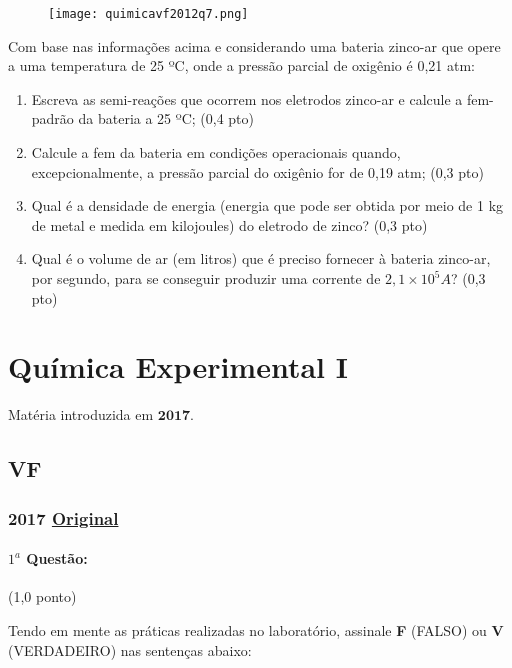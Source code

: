 \documentclass[12pt,a4paper]{article}
\newcommand{\original}[1]{\tiny \href{#1}{Original} \normalsize}
\begin{document}
\begin{figure}[h]
\centering
\texttt{[image: quimicavf2012q7.png]}
\end{figure}

Com base nas informações acima e considerando uma bateria zinco-ar que opere a uma temperatura de 25 ºC, onde a pressão parcial de oxigênio é 0,21 atm:

\begin{enumerate}[label=\alph*.]
\item Escreva as semi-reações que ocorrem nos eletrodos zinco-ar e calcule a fem-padrão da bateria a 25 ºC; \hfill (0,4 pto)
\item Calcule a fem da bateria em condições operacionais quando, excepcionalmente, a pressão parcial do oxigênio for de 0,19 atm; \hfill (0,3 pto)
\item Qual é a densidade de energia (energia que pode ser obtida por meio de 1 kg de metal e medida em kilojoules) do eletrodo de zinco? \hfill (0,3 pto)
\item Qual é o volume de ar (em litros) que é preciso fornecer à bateria zinco-ar, por segundo, para se conseguir produzir uma corrente de $2,1 \times 10^5 A$? \hfill (0,3 pto)
\end{enumerate}

\newpage
\section{Química Experimental I}
Matéria introduzida em $\textbf{2017}$.

\subsection{VF}

\subsubsection{2017 \original{https://drive.google.com/file/d/1r3ypKFjMsOtZjC9vxksglDivUHRcPBmC/view?usp=sharing}}

\paragraph{$1^a$ Questão:} (1,0 ponto)

Tendo em mente as práticas realizadas no laboratório, assinale \textbf{F} (FALSO) ou \textbf{V} (VERDADEIRO) nas sentenças abaixo:
\end{document}
